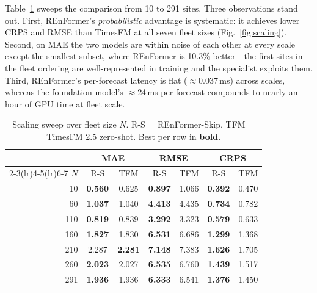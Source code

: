 \documentclass[10pt,twocolumn]{article}
\begin{document}
Table~\ref{tab:scaling} sweeps the comparison from 10 to 291 sites.
Three observations stand out. First, REnFormer's \emph{probabilistic}
advantage is systematic: it achieves lower CRPS and RMSE than TimesFM at
all seven fleet sizes (Fig.~\ref{fig:scaling}). Second, on MAE the two models are within noise of
each other at every scale except the smallest subset, where REnFormer is
10.3\% better---the first sites in the fleet ordering are
well-represented in training and the specialist exploits them. Third,
REnFormer's per-forecast latency is flat ($\approx$0.037\,ms) across
scales, whereas the foundation model's $\approx$24\,ms per forecast
compounds to nearly an hour of GPU time at fleet scale.

\begin{table}[h]
  \centering
  \caption{Scaling sweep over fleet size $N$. R-S = REnFormer-Skip,
    TFM = TimesFM 2.5 zero-shot. Best per row in \textbf{bold}.}
  \label{tab:scaling}
  \setlength{\tabcolsep}{4pt}
  \begin{tabular}{rcccccc}
    \toprule
    & \multicolumn{2}{c}{MAE} & \multicolumn{2}{c}{RMSE}
      & \multicolumn{2}{c}{CRPS} \\
    \cmidrule(lr){2-3}\cmidrule(lr){4-5}\cmidrule(lr){6-7}
    $N$ & R-S & TFM & R-S & TFM & R-S & TFM \\
    \midrule
    10  & \textbf{0.560} & 0.625 & \textbf{0.897} & 1.066 & \textbf{0.392} & 0.470 \\
    60  & \textbf{1.037} & 1.040 & \textbf{4.413} & 4.435 & \textbf{0.734} & 0.782 \\
    110 & \textbf{0.819} & 0.839 & \textbf{3.292} & 3.323 & \textbf{0.579} & 0.633 \\
    160 & \textbf{1.827} & 1.830 & \textbf{6.531} & 6.686 & \textbf{1.299} & 1.368 \\
    210 & 2.287 & \textbf{2.281} & \textbf{7.148} & 7.383 & \textbf{1.626} & 1.705 \\
    260 & \textbf{2.023} & 2.027 & \textbf{6.535} & 6.760 & \textbf{1.439} & 1.517 \\
    291 & \textbf{1.936} & 1.936 & \textbf{6.333} & 6.541 & \textbf{1.376} & 1.450 \\
    \bottomrule
  \end{tabular}
\end{table}
\end{document}
